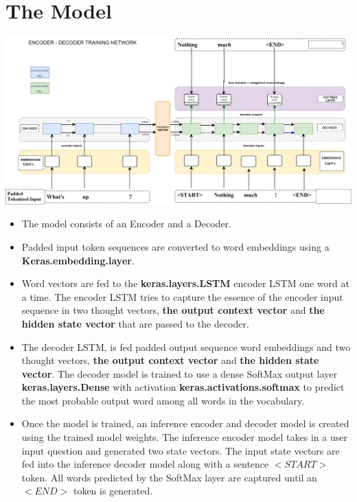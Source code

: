 \documentclass[12pt]{article}
\begin{document}
\section*{The Model}
\begin{center}
\includegraphics[width=160mm]{seq2seqModel.png}
\end{center}
\begin{itemize}
    \item The model consists of an Encoder and a Decoder.
    \item Padded input token sequences are converted to word embeddings using a\\ \textbf{Keras.embedding.layer}.
    \item  Word vectors are fed to the \textbf{keras.layers.LSTM} encoder LSTM one word at a time. The encoder LSTM tries to capture the essence of the encoder input sequence in two thought vectors, \textbf{the output context vector} and \textbf{the hidden state vector} that are passed to the decoder.
    \item The decoder LSTM, is fed padded output sequence word embeddings and two thought vectors, \textbf{the output context vector} and \textbf{the hidden state vector}. The decoder model is trained to use a dense SoftMax output layer \textbf{keras.layers.Dense} with activation \textbf{keras.activations.softmax} to predict the most probable output word among all words in the vocabulary.
    \item Once  the model is trained, an inference encoder and decoder model is created using the trained model weights. The inference encoder model takes in a user input question and generated two state vectors. The input state vectors are fed into the inference decoder model along with a sentence $<START>$ token. All words predicted by the SoftMax layer are captured until an $<END>$ token is generated. 
\end{itemize}
\end{document}
